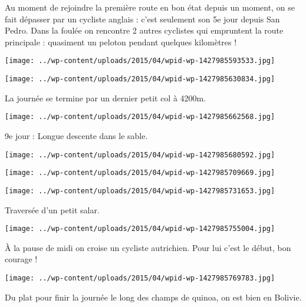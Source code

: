 \newline
 Au moment de rejoindre la première route en bon état depuis un moment, on se fait dépasser par un cycliste anglais : c'est seulement son 5e jour depuis San Pedro. \newline
 Dans la foulée on rencontre 2 autres cyclistes qui empruntent la route principale : quasiment un peloton pendant quelques kilomètres ! \newline
 \newline
\centerline{\texttt{[image: ../wp-content/uploads/2015/04/wpid-wp-1427985593533.jpg]} } 
 \newline
 \newline
\centerline{\texttt{[image: ../wp-content/uploads/2015/04/wpid-wp-1427985630834.jpg]} } 
 \newline
 La journée se termine par un dernier petit col à 4200m. \newline
 \newline
\centerline{\texttt{[image: ../wp-content/uploads/2015/04/wpid-wp-1427985662568.jpg]} } 
 \newline
 9e jour : \newline
 Longue descente dans le sable. \newline
 \newline
\centerline{\texttt{[image: ../wp-content/uploads/2015/04/wpid-wp-1427985680592.jpg]} } 
 \newline
 \newline
\centerline{\texttt{[image: ../wp-content/uploads/2015/04/wpid-wp-1427985709669.jpg]} } 
 \newline
 \newline
\centerline{\texttt{[image: ../wp-content/uploads/2015/04/wpid-wp-1427985731653.jpg]} } 
 \newline
 Traversée d'un petit salar. \newline
 \newline
\centerline{\texttt{[image: ../wp-content/uploads/2015/04/wpid-wp-1427985755004.jpg]} } 
 \newline
 À la pause de midi on croise un cycliste autrichien. Pour lui c'est le début, bon courage ! \newline
 \newline
\centerline{\texttt{[image: ../wp-content/uploads/2015/04/wpid-wp-1427985769783.jpg]} } 
 \newline
 Du plat pour finir la journée le long des champs de quinoa, on est bien en Bolivie. \newline
